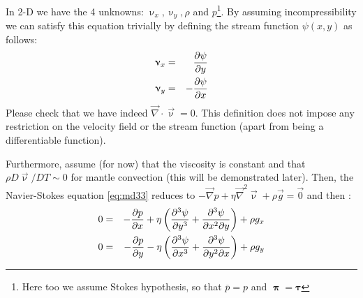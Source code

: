 In 2-D we have the 4 unknowns: $\upnu_x, \upnu_y,\rho$ and $p$\footnote{Here too we assume 
Stokes hypothesis, so that $\overline{p}=p$ and ${\bm \uppi}={\bm \tau}$}. 
By assuming incompressibility we can
satisfy this equation trivially by defining the stream function $\psi(x,y)$ as follows:
\begin{eqnarray}
\upnu_x &=& \frac{\partial \psi}{\partial y} \nonumber\\
\upnu_y &=&-\frac{\partial \psi}{\partial x} \label{eq:md37}
\end{eqnarray}
Please check that we have indeed $\vec\nabla\cdot\vec\upnu=0$.
This definition does not impose any restriction on the velocity
field or the stream function (apart from being a differentiable function).



Furthermore, assume (for now) that the viscosity is constant and that
$\rho D\vec\upnu /DT \sim 0$ for mantle
convection (this will be demonstrated later). Then, the Navier-Stokes equation \eqref{eq:md33}
reduces to $-\vec\nabla p + \eta \vec\nabla^2 \vec\upnu + \rho \vec{g} =\vec{0}$ and then :
\begin{eqnarray}
0 &=& -\frac{\partial p}{\partial x} + \eta \left(
\frac{\partial^3 \psi}{\partial y^3}  + \frac{\partial^3 \psi}{\partial x^2 \partial y}
\right) + \rho g_x \nonumber\\
0 &=& -\frac{\partial p}{\partial y} - \eta \left(
\frac{\partial^3 \psi}{\partial x^3}  + \frac{\partial^3 \psi}{\partial y^2 \partial x}
\right) + \rho g_y
\label{eq:md38}
\end{eqnarray}


